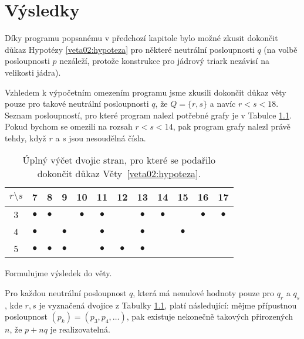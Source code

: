 \chapter{Výsledky} \label{vysledky}

Díky programu popsanému v předchozí kapitole bylo možné zkusit dokončit důkaz Hypotézy \ref{veta02:hypoteza} pro některé neutrální posloupnosti $q$ (na volbě posloupnosti $p$ nezáleží, protože konstrukce pro jádrový triark nezávisí na velikosti jádra). 

Vzhledem k výpočetním omezením programu jsme zkusili dokončit důkaz věty pouze pro takové neutrální posloupnosti $q$, že $Q = \lbrace r, s\rbrace$ a navíc $r<s<18$. Seznam posloupností, pro které program nalezl potřebné grafy je v Tabulce \ref{obr03:tabvysledky}. Pokud bychom se omezili na rozsah $r<s<14$, pak program grafy nalezl právě tehdy, když $r$ a $s$ jsou nesoudělná čísla.

\begin{table}[h]\centering
\begin{tabular}{ c | c c c c c c c c c c c }
  {$r\setminus s$} & 7 & 8 & 9 & 10 & 11 & 12 & 13 & 14 & 15 & 16 & 17 \\ \hline
  3 & $\bullet$ & $\bullet$ &  & $\bullet$ & $\bullet$ &  & $\bullet$ & $\bullet$ &  & $\bullet$ & $\bullet$ \\
  4 & $\bullet$ &  & $\bullet$ &  & $\bullet$ &  & $\bullet$ &  & $\bullet$ \\
  5 & $\bullet$ & $\bullet$ & $\bullet$ &  & $\bullet$ & $\bullet$ & $\bullet$  
\end{tabular}
\caption{Úplný výčet dvojic stran, pro které se podařilo dokončit důkaz Věty~\ref{veta02:hypoteza}.}
\label{obr03:tabvysledky}
\end{table}

Formulujme výsledek do věty.

\begin{veta} \label{veta:vysledek}
Pro každou neutrální posloupnost $q$, která má nenulové hodnoty pouze pro $q_r$ a $q_s$, kde $r,s$ je vyznačená dvojice z Tabulky \ref{obr03:tabvysledky}, platí následující: 
mějme přípustnou posloupnost $(p_k) = (p_3,p_4,\dots)$, pak existuje nekonečně takových přirozených $n$, že $p+nq$ je realizovatelná.
\end{veta}


